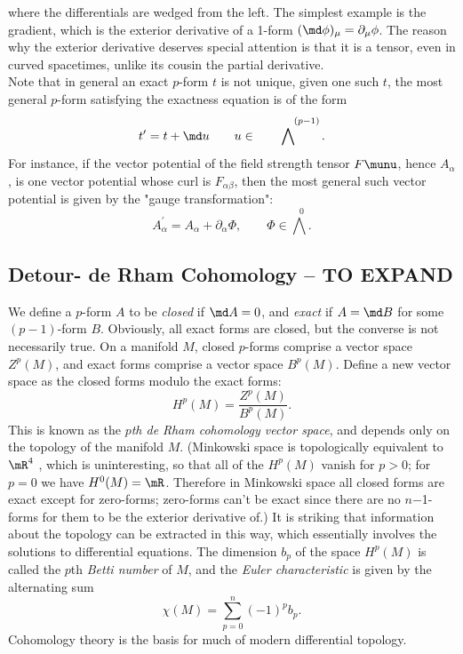 where the differentials are wedged from the left. The simplest example is the gradient, which is the exterior derivative of a 1-form $(\md \phi)_{\mu} = \partial_{\mu}\phi$. The reason why the exterior derivative deserves special attention is that it is a tensor, even in
curved spacetimes, unlike its cousin the partial derivative.\\
Note that in general an exact $p$-form $t$ is not unique, given one such $t$, the most general $p$-form satisfying the exactness equation is of the form
\begin{equation}
	t^\prime = t + \md u \qquad u\in\bigwedge^{\quad \quad \quad (p-1)}.
\end{equation}
For instance, if the vector potential of the field strength tensor $F\munu$, hence $A_\alpha$, is one vector potential whose curl is $F_{\alpha \beta}$, then the most general such vector potential is given by the "gauge transformation":
\begin{equation}
	A^\prime_\alpha = A_\alpha + \partial_\alpha \Phi, \qquad \Phi \in \bigwedge^{\;\;0}.
\end{equation}





\subsection{Detour- de Rham Cohomology -- TO EXPAND}
We define a $p$-form $A$ to be \emph{closed} if $\md A = 0$,
and \emph{exact} if $A = \md B$ for some $(p − 1)$-form $B$. Obviously, all exact forms are closed, but the
converse is not necessarily true. On a manifold $M$, closed $p$-forms comprise a vector space
$Z^p (M)$, and exact forms comprise a vector space $B^p (M)$. Define a new vector space as the
closed forms modulo the exact forms:
\begin{equation}
	H^p(M) = \frac{Z^p(M)}{B^p(M)}.
\end{equation}
This is known as the \emph{$p$th de Rham cohomology vector space}, and depends only on the
topology of the manifold $M$. (Minkowski space is topologically equivalent to $\mR^4$ , which is
uninteresting, so that all of the $H^p (M)$ vanish for $p > 0$; for $p = 0$ we have $H^0 (M) = \mR$.
Therefore in Minkowski space all closed forms are exact except for zero-forms; zero-forms
can’t be exact since there are no $n$−1-forms for them to be the exterior derivative of.) It is
striking that information about the topology can be extracted in this way, which essentially
involves the solutions to differential equations. The dimension $b_p$ of the space $H^p (M)$ is
called the $p$th \emph{Betti number} of $M$, and the \emph{Euler characteristic} is given by the alternating
sum
\begin{equation}
	\chi(M) = \sum_{p=0}^{n} (-1)^p b_p.
\end{equation}
Cohomology theory is the basis for much of modern differential topology.



